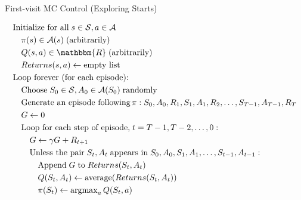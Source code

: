 \documentclass[ignorenonframetext,xcolor=x11names]{beamer}
\begin{document}
\begin{frame}[label=full]{First-visit MC Control (Exploring Starts)}
\begin{block}{}
\footnotesize
\begin{align*}
& \text{Initialize for all}\; s \in \mathcal{S}, a \in \mathcal{A} \\
& \quad \pi(s) \in \mathcal{A}(s) \; \text{(arbitrarily)} \\
& \quad Q(s,a) \in \mathbbm{R}\; \text{(arbitrarily)} \\
& \quad Returns(s, a) \leftarrow \text{empty list} \\
& \text{Loop forever (for each episode):} \\
& \quad \text{Choose}\; S_0 \in \mathcal{S}, A_0 \in \mathcal{A}(S_0)\; \text{randomly} \\
& \quad \text{Generate an episode following}\, \pi: S_0, A_0, R_1, S_1, A_1, R_2, \ldots, S_{T-1}, A_{T-1}, R_{T} \\
& \quad G \leftarrow 0 \\
& \quad \text{Loop for each step of episode,}\; t = T-1, T-2, \ldots, 0: \\
& \quad \quad G \leftarrow \gamma G + R_{t+1} \\
& \quad \quad \text{Unless the pair}\; S_t, A_t \; \text{appears in}\; S_0, A_0, S_1, A_1, \ldots, S_{t-1}, A_{t-1}: \\
& \quad \quad \quad \text{Append}\; G\; \text{to}\; Returns(S_t, A_t) \\
& \quad \quad \quad Q(S_t, A_t) \leftarrow \operatorname{average}(Returns(S_t, A_t)) \\
& \quad \quad \quad \pi(S_t) \leftarrow \operatorname{arg max}_a Q(S_t, a)
\end{align*}
\end{block}
\end{frame}
\end{document}
